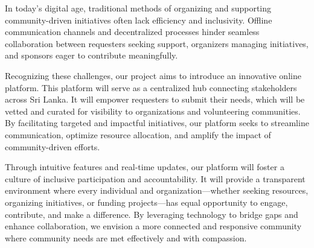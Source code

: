 In today's digital age, traditional methods of organizing and supporting community-driven initiatives often lack efficiency and inclusivity. Offline communication channels and decentralized processes hinder seamless collaboration between requesters seeking support, organizers managing initiatives, and sponsors eager to contribute meaningfully.

Recognizing these challenges, our project aims to introduce an innovative online platform. This platform will serve as a centralized hub connecting stakeholders across Sri Lanka. It will empower requesters to submit their needs, which will be vetted and curated for visibility to organizations and volunteering communities. By facilitating targeted and impactful initiatives, our platform seeks to streamline communication, optimize resource allocation, and amplify the impact of community-driven efforts.

Through intuitive features and real-time updates, our platform will foster a culture of inclusive participation and accountability. It will provide a transparent environment where every individual and organization—whether seeking resources, organizing initiatives, or funding projects—has equal opportunity to engage, contribute, and make a difference. By leveraging technology to bridge gaps and enhance collaboration, we envision a more connected and responsive community where community needs are met effectively and with compassion.


